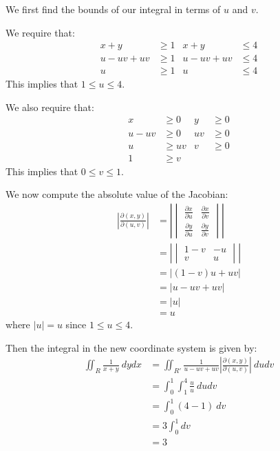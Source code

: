 \begin{solution}
     We first find the bounds of our integral in terms of \(u\) and \(v\). 
    
    We require that:
    \begin{align*}
        x + y &\geq 1 & x + y &\leq 4 \\
        u - uv + uv &\geq 1 & u - uv + uv &\leq 4 \\
        u &\geq 1 & u &\leq 4
    \end{align*}
    This implies that \(1 \leq u \leq 4\).
    
    We also require that:
    \begin{align*}
        x &\geq 0 & y &\geq 0 \\
        u - uv &\geq 0 & uv &\geq 0 \\
        u &\geq uv & v &\geq 0 \\
        1 &\geq v
    \end{align*}
    This implies that \(0 \leq v \leq 1\).
    
    We now compute the absolute value of the Jacobian:
    \begin{align*}
        \left|\frac{\partial(x, y)}{\partial(u, v)}\right| &= \left|\begin{vmatrix}
            \frac{\partial x}{\partial u} & \frac{\partial x}{\partial v} \\
            \frac{\partial y}{\partial u} & \frac{\partial y}{\partial v}
        \end{vmatrix}\right| \\
        &= \left|\begin{vmatrix}
            1 - v & -u \\
            v & u
        \end{vmatrix}\right| \\
        &= \left|(1-v)u + uv\right| \\
        &= \left|u - uv + uv\right| \\
        &= |u| \\
        &= u
    \end{align*}
    where \(|u| = u\) since \(1 \leq u \leq 4\). 
    
   Then the integral in the new coordinate system is given by:
    \begin{align*}
        \iint_R \frac{1}{x + y} \ dydx &= \iint_{R'} \frac{1}{u - uv + uv} \left|\frac{\partial(x, y)}{\partial(u, v)}\right| \ du dv \\
        &= \int_{0}^{1} \int_{1}^4 \frac{u}{u} \ du dv \\
        &= \int_{0}^{1} (4 - 1) \ dv \\
        &= 3 \int_{0}^{1} dv \\
        &= 3
    \end{align*}
\end{solution}

